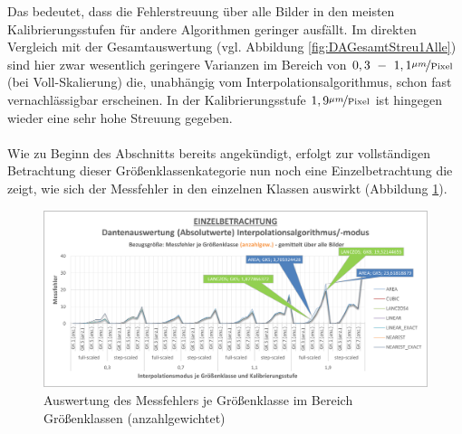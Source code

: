 \documentclass[
fontsize=10pt, 
listof = totoc,
parskip = half	
]{report}
\begin{document}
\noindent Das bedeutet, dass die Fehlerstreuung über alle Bilder in den meisten Kalibrierungsstufen für andere Algorithmen geringer ausfällt. Im direkten Vergleich mit der Gesamtauswertung (vgl. Abbildung \ref{fig:DAGesamtStreu1Alle}) sind hier zwar wesentlich geringere Varianzen im Bereich von $0,3~-~1,1\nicefrac{\mu m}{\text{Pixel}}$ (bei Voll-Skalierung) die, unabhängig vom Interpolationsalgorithmus, schon fast vernachlässigbar erscheinen. In der Kalibrierungsstufe $1,9\nicefrac{\mu m}{\text{Pixel}}$ ist hingegen wieder eine sehr hohe Streuung gegeben.
\\\\
\noindent Wie zu Beginn des Abschnitts bereits angekündigt, erfolgt zur vollständigen Betrachtung dieser Größenklassenkategorie nun noch eine Einzelbetrachtung die zeigt, wie sich der Messfehler in den einzelnen Klassen auswirkt (Abbildung \ref{fig:DAEinzelAbsolutGKanzahl}).

\begin{figure}[H]
	\centering
	\includegraphics[width=\textwidth, height=\textheight, keepaspectratio]{pics/DA_Einzel_Absolut_GKanzahl}
	\caption{Auswertung des Messfehlers je Größenklasse im Bereich Größenklassen (anzahlgewichtet)}
	\label{fig:DAEinzelAbsolutGKanzahl}
\end{figure}
\end{document}
